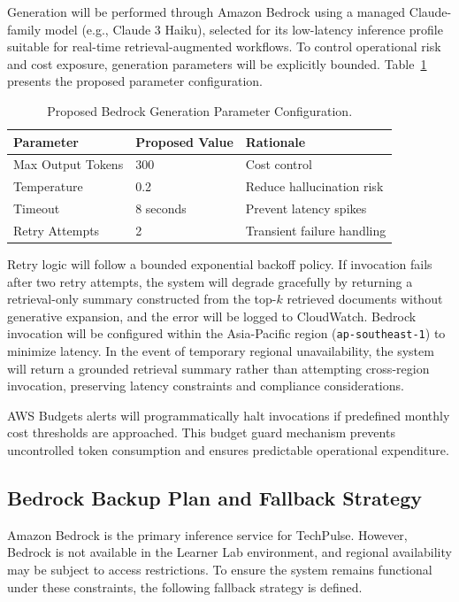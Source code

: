\documentclass[12pt,a4paper]{report}
\begin{document}
Generation will be performed through Amazon Bedrock using a managed Claude-family model (e.g., Claude 3 Haiku), selected for its low-latency inference profile suitable for real-time retrieval-augmented workflows. To control operational risk and cost exposure, generation parameters will be explicitly bounded. Table~\ref{tab:bedrock_params} presents the proposed parameter configuration.

\begin{table}[H]
\caption{Proposed Bedrock Generation Parameter Configuration.}
\label{tab:bedrock_params}
\centering
\begin{tabular}{lll}
\toprule
\textbf{Parameter} & \textbf{Proposed Value} & \textbf{Rationale} \\
\midrule
Max Output Tokens & 300 & Cost control \\
Temperature & 0.2 & Reduce hallucination risk \\
Timeout & 8 seconds & Prevent latency spikes \\
Retry Attempts & 2 & Transient failure handling \\
\bottomrule
\end{tabular}
\end{table}

Retry logic will follow a bounded exponential backoff policy. If invocation fails after two retry attempts, the system will degrade gracefully by returning a retrieval-only summary constructed from the top-$k$ retrieved documents without generative expansion, and the error will be logged to CloudWatch. Bedrock invocation will be configured within the Asia-Pacific region (\texttt{ap-southeast-1}) to minimize latency. In the event of temporary regional unavailability, the system will return a grounded retrieval summary rather than attempting cross-region invocation, preserving latency constraints and compliance considerations.

AWS Budgets alerts will programmatically halt invocations if predefined monthly cost thresholds are approached. This budget guard mechanism prevents uncontrolled token consumption and ensures predictable operational expenditure.

\subsection{Bedrock Backup Plan and Fallback Strategy}
\label{sec:bedrock_backup}

Amazon Bedrock is the primary inference service for TechPulse. However, Bedrock is not available in the Learner Lab environment, and regional availability may be subject to access restrictions. To ensure the system remains functional under these constraints, the following fallback strategy is defined.
\end{document}
